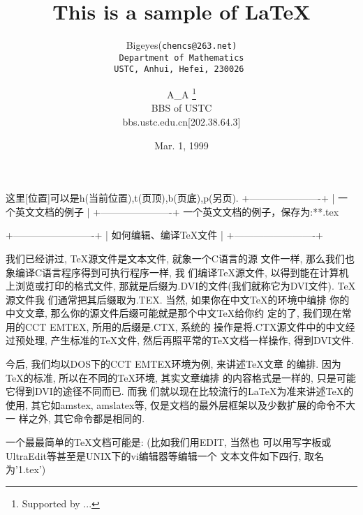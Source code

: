 \begin{center}
这里[位置]可以是h(当前位置),t(页顶),b(页底),p(另页).
  +----------------------+ 
  |  一个英文文档的例子  | 
  +----------------------+ 
一个英文文档的例子，保存为:**.tex 
\topmargin=0pt                          %
\oddsidemargin=0pt \evensidemargin=0pt  %
\textwidth=14cm                         %
\textheight=21cm                        %
\title{This is a sample of \LaTeX}      %
\author{Bigeyes(\tt{chencs@263.net})\\  %
        Department of Mathematics\\     %
        USTC, Anhui, Hefei, 230026      %
  \and                                  %
        A\_A                            %
  \thanks{Supported by ...}             %
        \\                              %
        BBS of USTC\\                   %
        bbs.ustc.edu.cn[202.38.64.3]}   %
\date{Mar. 1, 1999}                     %
 
  +-------------------------+ 
  |  如何编辑、编译TeX文件  | 
  +-------------------------+ 
 
    我们已经讲过, TeX源文件是文本文件, 就象一个C语言的源 
文件一样, 那么我们也象编译C语言程序得到可执行程序一样, 我 
们编译TeX源文件, 以得到能在计算机上浏览或打印的格式文件, 
那就是后缀为.DVI的文件(我们就称它为DVI文件). TeX源文件我 
们通常把其后缀取为.TEX. 当然, 如果你在中文TeX的环境中编排 
你的中文文章, 那么你的源文件后缀可能就是那个中文TeX给你约 
定的了, 我们现在常用的CCT EMTEX, 所用的后缀是.CTX, 系统的 
操作是将.CTX源文件中的中文经过预处理, 产生标准的TeX文件, 
然后再照平常的TeX文档一样操作, 得到DVI文件. 
  
    今后, 我们均以DOS下的CCT EMTEX环境为例, 来讲述TeX文章 
的编排. 因为TeX的标准, 所以在不同的TeX环境, 其实文章编排 
的内容格式是一样的, 只是可能它得到DVI的途径不同而已. 而我 
们就以现在比较流行的LaTeX为准来讲述TeX的使用, 其它如amstex, 
amslatex等, 仅是文档的最外层框架以及少数扩展的命令不大一 
样之外, 其它命令都是相同的. 
  
    一个最最简单的TeX文档可能是: (比如我们用EDIT, 当然也 
可以用写字板或UltraEdit等甚至是UNIX下的vi编辑器等编辑一个 
文本文件如下四行, 取名为'1.tex') 


\end{center}
